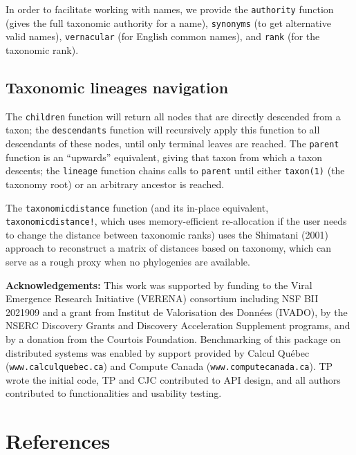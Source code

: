 \documentclass[10pt,oneside]{article}
\begin{document}
In order to facilitate working with names, we provide the
\texttt{authority} function (gives the full taxonomic authority for a
name), \texttt{synonyms} (to get alternative valid names),
\texttt{vernacular} (for English common names), and \texttt{rank} (for
the taxonomic rank).

\hypertarget{taxonomic-lineages-navigation}{%
\subsection{Taxonomic lineages
navigation}\label{taxonomic-lineages-navigation}}

The \texttt{children} function will return all nodes that are directly
descended from a taxon; the \texttt{descendants} function will
recursively apply this function to all descendants of these nodes, until
only terminal leaves are reached. The \texttt{parent} function is an
``upwards'' equivalent, giving that taxon from which a taxon descents;
the \texttt{lineage} function chains calls to \texttt{parent} until
either \texttt{taxon(1)} (the taxonomy root) or an arbitrary ancestor is
reached.

The \texttt{taxonomicdistance} function (and its in-place equivalent,
\texttt{taxonomicdistance!}, which uses memory-efficient re-allocation
if the user needs to change the distance between taxonomic ranks) uses
the Shimatani (2001) approach to reconstruct a matrix of distances based
on taxonomy, which can serve as a rough proxy when no phylogenies are
available.

\textbf{Acknowledgements:} This work was supported by funding to the
Viral Emergence Research Initiative (VERENA) consortium including NSF
BII 2021909 and a grant from Institut de Valorisation des Données
(IVADO), by the NSERC Discovery Grants and Discovery Acceleration
Supplement programs, and by a donation from the Courtois Foundation.
Benchmarking of this package on distributed systems was enabled by
support provided by Calcul Québec (\texttt{www.calculquebec.ca}) and
Compute Canada (\texttt{www.computecanada.ca}). TP wrote the initial
code, TP and CJC contributed to API design, and all authors contributed
to functionalities and usability testing.

\hypertarget{references}{%
\section*{References}\label{references}}
\end{document}
